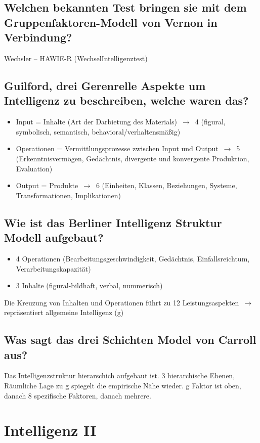 \documentclass[a6paper,10pt,DIV=40]{scrartcl}
\begin{document}
\subsection{Welchen bekannten Test bringen sie mit dem Gruppenfaktoren-Modell von Vernon in Verbindung?}
Wechsler – HAWIE-R (WechselIntelligenztest)
\subsection{Guilford, drei Gerenrelle Aspekte um Intelligenz zu beschreiben, welche waren das?}
\begin{itemize}
\item Input = Inhalte (Art der Darbietung des Materials) $\,\to\,$ 4 (figural, symbolisch, semantisch, behavioral/verhaltensmäßig)
\item Operationen = Vermittlungsprozesse zwischen Input und Output $\,\to\,$ 5 (Erkenntnisvermögen, Gedächtnis, divergente und konvergente Produktion, Evaluation)
\item Output = Produkte $\,\to\,$ 6 (Einheiten, Klassen, Beziehungen, Systeme, Transformationen, Implikationen)
\end{itemize}
\subsection{Wie ist das Berliner Intelligenz Struktur Modell aufgebaut?}
\begin{itemize}
\item 4 Operationen (Bearbeitungsgeschwindigkeit, Gedächtnis, Einfallsreichtum, Verarbeitungskapazität)
\item 3 Inhalte (figural-bildhaft, verbal, nummerisch)
\end{itemize}
Die Kreuzung von Inhalten und Operationen führt zu 12 Leistungsaspekten $\,\to\,$ repräsentiert allgemeine Intelligenz (g)
\subsection{Was sagt das drei Schichten Model von Carroll aus?}
Das Intelligenzstruktur hierarschich aufgebaut ist. 3 hierarchische Ebenen, Räumliche Lage zu g spiegelt die empirische Nähe wieder. g Faktor ist oben, danach 8 spezifische Faktoren, danach mehrere.


\section{Intelligenz II}
\end{document}
